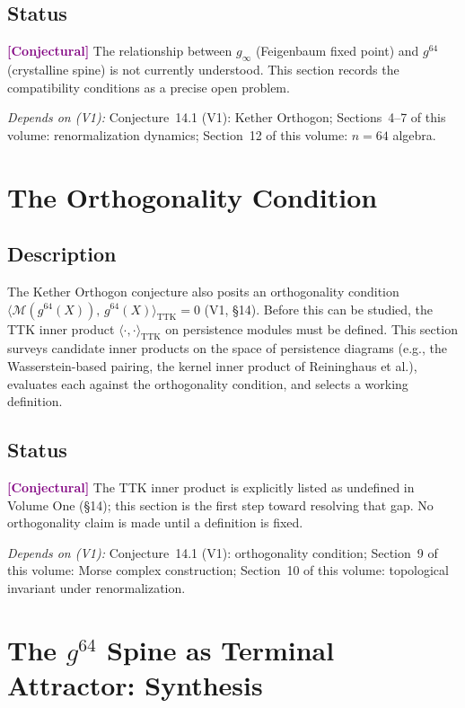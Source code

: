 \documentclass[11pt]{article}
\newcommand{\conjectural}{\textcolor{purple}{\textbf{[Conjectural]}}}
\newcommand{\depends}[1]{\smallskip\noindent\textit{Depends on (V1):} #1.\smallskip}
\begin{document}
\subsection*{Status}
\conjectural{} The relationship between $g_\infty$ (Feigenbaum fixed point)
and $g^{64}$ (crystalline spine) is not currently understood. This section
records the compatibility conditions as a precise open problem.

\depends{Conjecture~14.1 (V1): Kether Orthogon;
Sections~4--7 of this volume: renormalization dynamics;
Section~12 of this volume: $n = 64$ algebra}

\section{The Orthogonality Condition}

\subsection*{Description}
The Kether Orthogon conjecture also posits an orthogonality condition
$\langle \mathcal{M}(g^{64}(X)),\, g^{64}(X) \rangle_{\mathrm{TTK}} = 0$
(V1, \S14). Before this can be studied, the TTK inner product
$\langle \cdot, \cdot \rangle_{\mathrm{TTK}}$ on persistence modules must
be defined. This section surveys candidate inner products on the space of
persistence diagrams (e.g., the Wasserstein-based pairing, the kernel
inner product of Reininghaus et al.), evaluates each against the
orthogonality condition, and selects a working definition.

\subsection*{Status}
\conjectural{} The TTK inner product is explicitly listed as undefined in
Volume One (\S14); this section is the first step toward resolving that
gap. No orthogonality claim is made until a definition is fixed.

\depends{Conjecture~14.1 (V1): orthogonality condition;
Section~9 of this volume: Morse complex construction;
Section~10 of this volume: topological invariant under renormalization}

\section{The $g^{64}$ Spine as Terminal Attractor: Synthesis}
\end{document}
